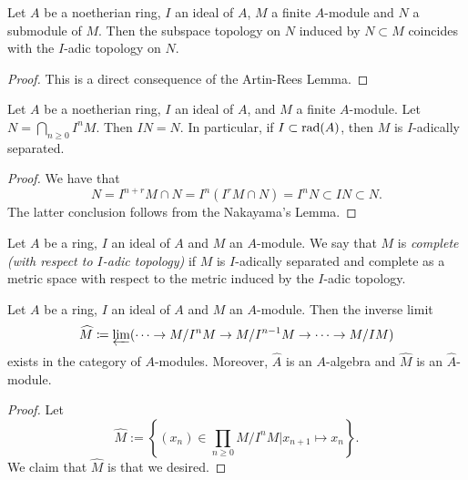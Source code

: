    \begin{corollary}\label{cor: subspace topology coincides with I-adic topology}
        Let \(A\) be a noetherian ring, \(I\) an ideal of \(A\), \(M\) a finite \(A\)-module and \(N\) a submodule of \(M\).
        Then the subspace topology on \(N\) induced by \(N \subset M\) coincides with the \(I\)-adic topology on \(N\).
    \end{corollary}
    \begin{proof}
        This is a direct consequence of the Artin-Rees Lemma.
    \end{proof}

    \begin{corollary}\label{cor: finite module over noetherian ring is I-adically separated}
        Let \(A\) be a noetherian ring, \(I\) an ideal of \(A\), and \(M\) a finite \(A\)-module. 
        Let \(N = \bigcap_{n \geq 0} I^n M\).
        Then \(I N = N\).
        In particular, if \(I \subset \operatorname{rad}(A)\), then \(M\) is \(I\)-adically separated.
    \end{corollary}
    \begin{proof}
        We have that 
        \[ N = I^{n+r}M \cap N = I^n (I^r M \cap N) = I^n N \subset IN \subset N.\]
        The latter conclusion follows from the Nakayama's Lemma.
    \end{proof}

    \begin{definition}\label{def: I-adically complete}
        Let \(A\) be a ring, \(I\) an ideal of \(A\) and \(M\) an \(A\)-module.
        We say that \(M\) is \emph{complete (with respect to \(I\)-adic topology)} 
        if \(M\) is \(I\)-adically separated and complete as a metric space with respect to the metric induced by the \(I\)-adic topology.
    \end{definition}

    \begin{lemma}\label{lem: formal completion exists}
        Let \(A\) be a ring, \(I\) an ideal of \(A\) and \(M\) an \(A\)-module. 
        Then the inverse limit
        \[ \widehat{M} \coloneqq \varprojlim ( \cdots \to M/I^nM \to M/I^{n-1}M \to \cdots \to M/IM) \]
        exists in the category of \(A\)-modules.
        Moreover, \(\widehat{A}\) is an \(A\)-algebra and \(\widehat{M}\) is an \(\widehat{A}\)-module.
    \end{lemma}
    \begin{proof}
        Let 
        \[ \widehat{M}:= \left\{ (x_n) \in \prod_{n \geq 0} M/I^n M \Big| x_{n+1} \mapsto x_n \right\}. \]
        We claim that \(\widehat{M}\) is that we desired.
    \end{proof}

